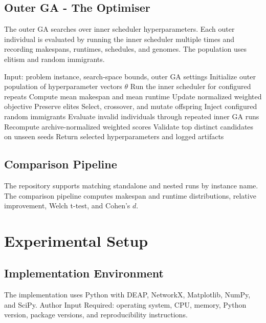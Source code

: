 \documentclass{ieeeaccess}
\begin{document}
\subsection{Outer GA - The Optimiser}

The outer GA searches over inner scheduler hyperparameters. Each outer individual is evaluated by running the inner scheduler multiple times and recording makespans, runtimes, schedules, and genomes. The population uses elitism and random immigrants.

\begin{algorithm}[t]
\caption{Outer Hyperparameter GA}
\label{alg:outer_ga}
\begin{algorithmic}[1]
\STATE Input: problem instance, search-space bounds, outer GA settings
\STATE Initialize outer population of hyperparameter vectors \(\theta\)
    \STATE Run the inner scheduler for configured repeats
    \STATE Compute mean makespan and mean runtime
    \STATE Update normalized weighted objective
\ENDFOR
{}
    \STATE Preserve elites
    \STATE Select, crossover, and mutate offspring
    \STATE Inject configured random immigrants
    \STATE Evaluate invalid individuals through repeated inner GA runs
    \STATE Recompute archive-normalized weighted scores
\ENDFOR
\STATE Validate top distinct candidates on unseen seeds
\STATE Return selected hyperparameters and logged artifacts
\end{algorithmic}
\end{algorithm}

\subsection{Comparison Pipeline}

The repository supports matching standalone and nested runs by instance name. The comparison pipeline computes makespan and runtime distributions, relative improvement, Welch t-test, and Cohen's \(d\).

\section{Experimental Setup}
\label{sec:experimental_setup}

\subsection{Implementation Environment}

The implementation uses Python with DEAP, NetworkX, Matplotlib, NumPy, and SciPy. Author Input Required: operating system, CPU, memory, Python version, package versions, and reproducibility instructions.
\end{document}
